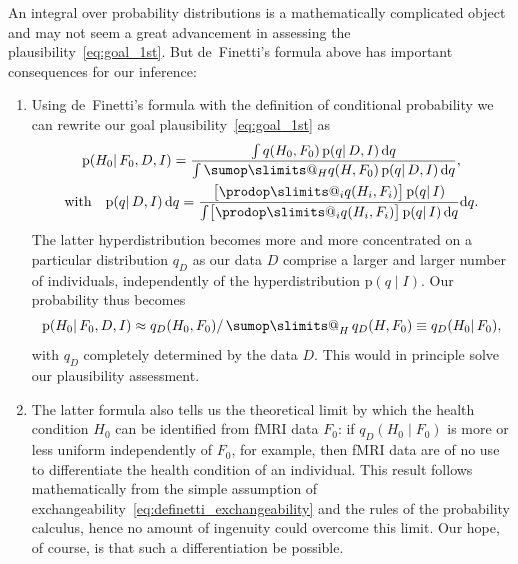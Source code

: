 \documentclass[\ifafour a4paper,12pt,\else a5paper,10pt,\fi%
onecolumn,oneside,article,%
british%
]{memoir}
\makeatletter
\theoremstyle{remark}
\theoremstyle{innote}
\def\sum{\DOTSI\sumop\slimits@}
\def\prod{\DOTSI\prodop\slimits@}
\newcommand*{\di}{\mathrm{d}}%
\newcommand*{\pf}{\mathrm{p}}%
\renewcommand*{\|}{\mathpunct{|}}
\newcommand*{\tsum}{\mathop{\textstyle\sum}\nolimits}
\newcommand*{\yH}{H}
\newcommand*{\yD}{D}
\newcommand*{\yF}{F}
\newcommand*{\yp}{q}
\newcommand*{\ypc}{\yp_{\yD}}
\newcommand*{\yI}{I}
\theoremstyle{plain}
\makeatother
\begin{document}
An integral over probability distributions is a mathematically complicated
object and may not seem a great advancement in assessing the
plausibility~\eqref{eq:goal_1st}. But de~Finetti's formula above has
important consequences for our inference:
\begin{enumerate}
\item Using de~Finetti's formula with the definition of conditional
  probability we can rewrite our goal plausibility~\eqref{eq:goal_1st} as
  \begin{subequations}\label{eq:goal_1st_exchangeability}
      \begin{gather}
        \pf(\yH_0 \| \yF_0, \yD, \yI)
        = \frac{ \int \yp(\yH_0,\yF_0)\,
          \pf(\yp \|\yD,\yI) \,\di\yp
        }{
          \int \sum_{\yH}\yp(\yH,\yF_0)\,
          \pf(\yp \|\yD,\yI) \,\di\yp },
        \\
        \text{with} \quad
        \pf(\yp\|\yD,\yI) \,\di\yp
        = \frac{ \bigl[ \prod_i \yp(\yH_i,\yF_i) \bigr]\,
          \pf(\yp \|\yI)
        }{
          \int \bigl[ \prod_i \yp(\yH_i,\yF_i)\bigr]\,
          \pf(\yp \|\yI) \,\di\yp }\di\yp.
        \label{eq:updated_hyperprior}
      \end{gather}
  \end{subequations}
  The latter hyperdistribution becomes more and more concentrated on a
  particular distribution $\ypc$ as our data $\yD$ comprise a larger and
  larger number of individuals, independently of the hyperdistribution
  $\pf(\yp \|\yI)$. Our probability thus becomes
\begin{equation}
  \label{eq:goal_1st_limit}
  \pf(\yH_0 \| \yF_0, \yD, \yI) \approx
  \ypc(\yH_0,\yF_0) / \tsum_{\yH}\ypc(\yH,\yF_0)
  \equiv \ypc(\yH_0\|\yF_0),
\end{equation}
with $\ypc$ completely determined by the data $\yD$. This would in
principle solve our plausibility assessment.
\item The latter formula also tells us the theoretical limit by which the
  health condition $\yH_0$ can be identified from fMRI data $\yF_0$: if
  $\ypc(\yH_0\|\yF_0)$ is more or less uniform independently of $\yF_0$,
  for example, then fMRI data are of no use to differentiate the
  health condition of an individual. This result follows mathematically
  from the simple assumption of
  exchangeability~\eqref{eq:definetti_exchangeability} and the rules of the
  probability calculus, hence no amount of ingenuity could overcome this
  limit. Our hope, of course, is that such a differentiation be possible.
\end{enumerate}
\end{document}
